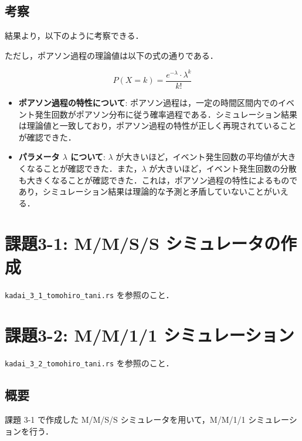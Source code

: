 \documentclass[fleqn, a4paper. 12pt]{jsarticle}
\begin{document}
    \subsection*{考察}

      結果より，以下のように考察できる．

      ただし，ポアソン過程の理論値は以下の式の通りである．

      \begin{equation}
        P(X = k) = \frac{e^{-\lambda} \cdot \lambda^k}{k!}
      \end{equation}

      \begin{itemize}
        \item \textbf{ポアソン過程の特性について}: ポアソン過程は，一定の時間区間内でのイベント発生回数がポアソン分布に従う確率過程である．シミュレーション結果は理論値と一致しており，ポアソン過程の特性が正しく再現されていることが確認できた．
        \item \textbf{パラメータ $\lambda$ について}: $\lambda$ が大きいほど，イベント発生回数の平均値が大きくなることが確認できた．また，$\lambda$ が大きいほど，イベント発生回数の分散も大きくなることが確認できた．これは，ポアソン過程の特性によるものであり，シミュレーション結果は理論的な予測と矛盾していないことがいえる．
      \end{itemize}

  \newpage

  \section*{課題3-1: M/M/S/S シミュレータの作成}

    \texttt{kadai\_3\_1\_tomohiro\_tani.rs} を参照のこと．

  \newpage

  \section*{課題3-2: M/M/1/1 シミュレーション}

    \texttt{kadai\_3\_2\_tomohiro\_tani.rs} を参照のこと．

    \subsection*{概要}

      課題 3-1 で作成した M/M/S/S シミュレータを用いて，M/M/1/1 シミュレーションを行う．
      
\end{document}
